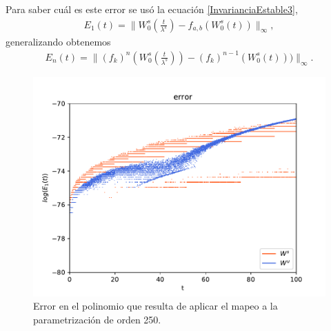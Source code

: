 \documentclass[11pt]{beamer}
\theoremstyle{definition}
\begin{document}
\begin{frame}
Para saber cuál es este error se usó la ecuación \eqref{InvarianciaEstable3},
\begin{eqnarray}
E_{1}(t)=\bigg\| W_{0}^{s}\left(\frac{t}{\lambda^{s}}\right)-f_{a,b}(W_{0}^{s}(t))\bigg\|_{\infty},
\label{error-1aplicacion}
\end{eqnarray}
generalizando obtenemos
\begin{eqnarray}
E_{n}(t)=\bigg\| (f_{k})^{n}\left(W_{0}^{s}\left(\frac{t}{\lambda^{s}}\right)\right)- (f_{k})^{n-1}(W_{0}^{s}(t)))\bigg\|_{\infty}.
\label{error-n-aplicacion}
\end{eqnarray}
\end{frame}
\begin{frame}
\begin{figure}[h!]
\centering
\includegraphics[scale=0.6]{error1ite.pdf}
\caption{Error en el polinomio que resulta de aplicar el mapeo a la parametrización de orden 250.}
\label{error-1iteracion}
\end{figure}
\end{frame}
\end{document}
